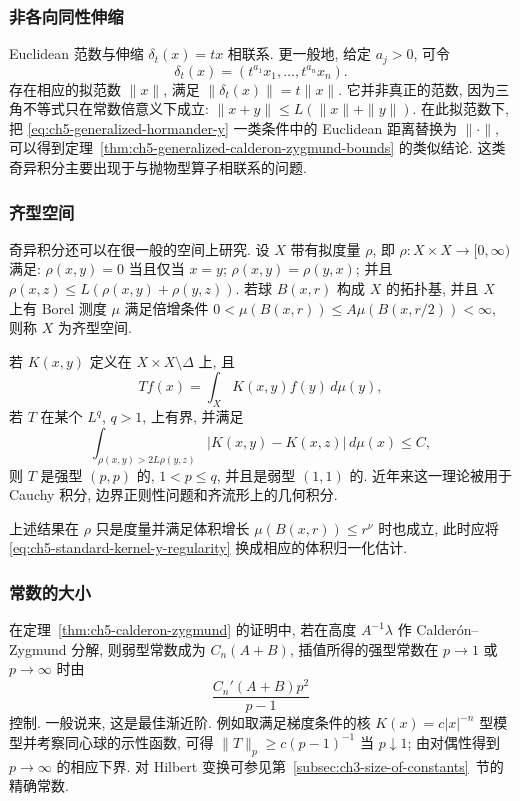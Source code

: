 \subsubsection{非各向同性伸缩}
\label{subsec:ch5-anisotropic-dilations}

Euclidean 范数与伸缩 $\delta_t(x)=tx$ 相联系. 更一般地, 给定 $a_j>0$, 可令
\[
 \delta_t(x)=(t^{a_1}x_1,\ldots,t^{a_n}x_n).
\]
存在相应的拟范数 $\|x\|$, 满足 $\|\delta_t(x)\|=t\|x\|$. 它并非真正的范数, 因为三角不等式只在常数倍意义下成立: $\|x+y\|\le L(\|x\|+\|y\|)$. 在此拟范数下, 把 \eqref{eq:ch5-generalized-hormander-y} 一类条件中的 Euclidean 距离替换为 $\|\cdot\|$, 可以得到定理~\ref{thm:ch5-generalized-calderon-zygmund-bounds} 的类似结论. 这类奇异积分主要出现于与抛物型算子相联系的问题.

\hypertarget{chapter-05-page-121}{}
\subsubsection{齐型空间}
\label{subsec:ch5-spaces-homogeneous-type}

奇异积分还可以在很一般的空间上研究. 设 $X$ 带有拟度量 $\rho$, 即 $\rho:X\times X\to[0,\infty)$ 满足: $\rho(x,y)=0$ 当且仅当 $x=y$; $\rho(x,y)=\rho(y,x)$; 并且 $\rho(x,z)\le L(\rho(x,y)+\rho(y,z))$. 若球 $B(x,r)$ 构成 $X$ 的拓扑基, 并且 $X$ 上有 Borel 测度 $\mu$ 满足倍增条件 $0<\mu(B(x,r))\le A\mu(B(x,r/2))<\infty$, 则称 $X$ 为齐型空间.

若 $K(x,y)$ 定义在 $X\times X\setminus\Delta$ 上, 且
\[
 Tf(x)=\int_XK(x,y)f(y)\,d\mu(y),
\]
若 $T$ 在某个 $L^q$, $q>1$, 上有界, 并满足
\begin{equation}
\label{eq:ch5-homogeneous-space-hormander}
 \int_{\rho(x,y)>2L\rho(y,z)}|K(x,y)-K(x,z)|\,d\mu(x)\le C,
\end{equation}
则 $T$ 是强型 $(p,p)$ 的, $1<p\le q$, 并且是弱型 $(1,1)$ 的. 近年来这一理论被用于 Cauchy 积分, 边界正则性问题和齐流形上的几何积分.

\hypertarget{chapter-05-page-122}{}
上述结果在 $\rho$ 只是度量并满足体积增长 $\mu(B(x,r))\le r^\nu$ 时也成立, 此时应将 \eqref{eq:ch5-standard-kernel-y-regularity} 换成相应的体积归一化估计.

\subsubsection{常数的大小}
\label{subsec:ch5-size-of-constants}

在定理~\ref{thm:ch5-calderon-zygmund} 的证明中, 若在高度 $A^{-1}\lambda$ 作 Calderón--Zygmund 分解, 则弱型常数成为 $C_n(A+B)$, 插值所得的强型常数在 $p\to1$ 或 $p\to\infty$ 时由
\[
 \frac{C_n'(A+B)p^2}{p-1}
\]
控制. 一般说来, 这是最佳渐近阶. 例如取满足梯度条件的核 $K(x)=c|x|^{-n}$ 型模型并考察同心球的示性函数, 可得 $\|T\|_p\ge c(p-1)^{-1}$ 当 $p\downarrow1$; 由对偶性得到 $p\to\infty$ 的相应下界. 对 Hilbert 变换可参见第~\ref{subsec:ch3-size-of-constants}~节的精确常数.

